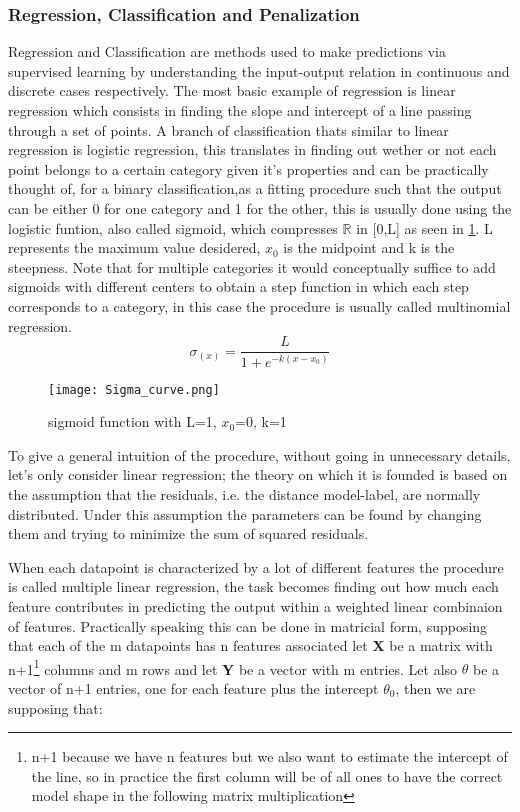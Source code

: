 \subsubsection{Regression, Classification and Penalization}
Regression and Classification are methods used to make predictions via supervised learning by understanding the input-output relation in continuous and discrete cases respectively. The most basic example of regression is linear regression which consists in finding the slope and intercept of a line passing through a set of points. A branch of classification thats similar to linear regression is logistic regression, this translates in finding out wether or not each point belongs to a certain category given it's properties and can be practically thought of, for a binary classification,as a fitting procedure such that the output can be either 0 for one category and 1 for the other, this is usually done using the logistic funtion, also called sigmoid, which compresses $\mathbb {R}$ in [0,L] as seen in  \ref{sigmoid}. L represents the maximum value desidered, $x_0$ is the midpoint and k is the steepness. Note that for multiple categories it would conceptually suffice to add sigmoids with different centers to obtain a step function in which each step corresponds to a category, in this case the procedure is usually called multinomial regression.
\begin{equation}
\sigma_{(x)} = \frac{L}{1+e^{-k(x-x_0)}}
\end{equation}

\begin{figure}[H]
		\centering
  		\texttt{[image: Sigma\_curve.png]}
        \caption{sigmoid function with L=1, $x_0$=0, k=1 \label{sigmoid}}
\end{figure}

To give a general intuition of the procedure, without going in unnecessary details, let's only consider linear regression; the theory on which it is founded is based on the assumption that the residuals, i.e. the distance model-label, are normally distributed. Under this assumption the parameters can be found by changing them and trying to minimize the sum of squared residuals.

When each datapoint is characterized by a lot of different features the procedure is called multiple linear regression, the task becomes finding out how much each feature contributes in predicting the output within a weighted linear combinaion of features. Practically speaking this can be done in matricial form, supposing that each of the m datapoints has n features associated let  \textbf{X} be a matrix with n+1\footnote{n+1 because we have n features but we also want to estimate the intercept of the line, so in practice the first column will be of all ones to have the correct model shape in the following matrix multiplication} columns and m rows and let  \textbf{Y} be a vector with m entries. Let also  \textbf{$\theta$} be a vector of n+1 entries, one for each feature plus the intercept $\theta_0$, then we are supposing that:

